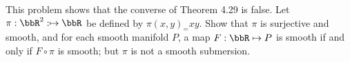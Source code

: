 This problem shows that the converse of Theorem 4.29 is false.  Let $\pi:\bbR^2:\mapsto\bbR$ be defined by $\pi(x,y)_ =xy$.  Show that $\pi$ is surjective and smooth, and for each smooth manifold $P$, a map $F:\bbR\mapsto P$ is smooth if and only if $F\circ\pi$ is smooth; but $\pi$ is not a smooth submersion.